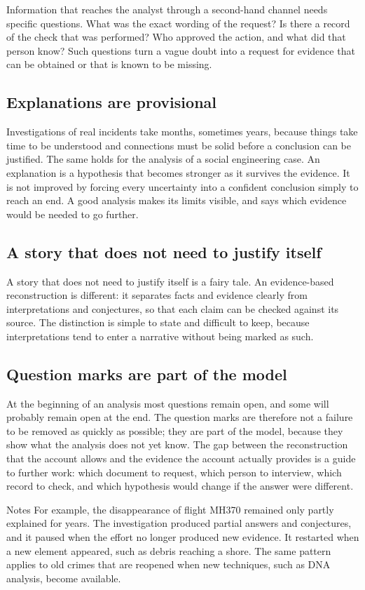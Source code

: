 Information that reaches the analyst through a second-hand channel needs specific questions. What was the exact wording of the request? Is there a record of the check that was performed? Who approved the action, and what did that person know? Such questions turn a vague doubt into a request for evidence that can be obtained or that is known to be missing.

\subsection{Explanations are provisional}
Investigations of real incidents take months, sometimes years, because things take time to be understood and connections must be solid before a conclusion can be justified. The same holds for the analysis of a social engineering case. An explanation is a hypothesis that becomes stronger as it survives the evidence. It is not improved by forcing every uncertainty into a confident conclusion simply to reach an end. A good analysis makes its limits visible, and says which evidence would be needed to go further.

\subsection{A story that does not need to justify itself}
A story that does not need to justify itself is a fairy tale. An evidence-based reconstruction is different: it separates facts and evidence clearly from interpretations and conjectures, so that each claim can be checked against its source. The distinction is simple to state and difficult to keep, because interpretations tend to enter a narrative without being marked as such.

\subsection{Question marks are part of the model}
At the beginning of an analysis most questions remain open, and some will probably remain open at the end. The question marks are therefore not a failure to be removed as quickly as possible; they are part of the model, because they show what the analysis does not yet know. The gap between the reconstruction that the account allows and the evidence the account actually provides is a guide to further work: which document to request, which person to interview, which record to check, and which hypothesis would change if the answer were different.

\begin{nota}{Notes}
	For example, the disappearance of flight MH370 remained only partly explained for years. The investigation produced partial answers and conjectures, and it paused when the effort no longer produced new evidence. It restarted when a new element appeared, such as debris reaching a shore. The same pattern applies to old crimes that are reopened when new techniques, such as DNA analysis, become available.
\end{nota}

